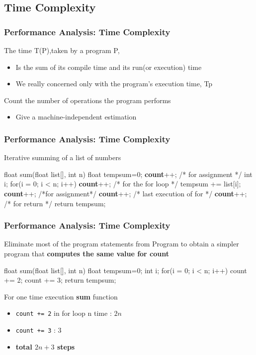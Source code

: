 \documentclass[newPxFont,sthlmFooter,nooffset]{beamer}
\begin{document}
\subsection{Time Complexity}
\begin{frame}[t]
  \frametitle{Performance Analysis: Time Complexity}
The time T(P),taken by a program P,
\begin{itemize}
\item Is the sum of its compile time and its run(or execution) time
\item We really concerned only with the program’s execution time, Tp
\end{itemize}


Count the number of operations the program performs
  \begin{itemize}
  \item Give a machine-independent estimation
  \end{itemize}

\end{frame}


\begin{frame}[t, fragile]
  \frametitle{Performance Analysis: Time Complexity}
Iterative summing of a list of numbers
\begin{codedef}
float sum(float list[], int n) { 
   float tempsum=0;
   \textbf{count}++; /* for assignment */ 
   int i;
   for(i = 0; i < n; i++) { 
      \textbf{count}++; /* for the for loop */ 
      tempsum += list[i];
      \textbf{count}++; /*for assignment*/ 
   }
   \textbf{count}++; /* last execution of for */ 
   \textbf{count}++; /* for return */
   return tempsum;
}
\end{codedef}
\end{frame}


\begin{frame}[t, fragile]
  \frametitle{Performance Analysis: Time Complexity}
Eliminate most of the program statements from Program to obtain a simpler program that \textbf{computes the same value for count}
\begin{codedef}
float sum(float list[], int n) {
   float tempsum=0;
   int i;
   for(i = 0; i < n; i++)
      count += 2;
   count += 3;
   return tempsum;
}
\end{codedef}
For one time execution \textbf{sum} function
\begin{itemize}
\item \texttt{count += 2} in for loop n time : $2n$
\item \texttt{count += 3} : 3
\item \textbf{total $2n+3$ steps}
\end{itemize}
\end{frame}
\end{document}
